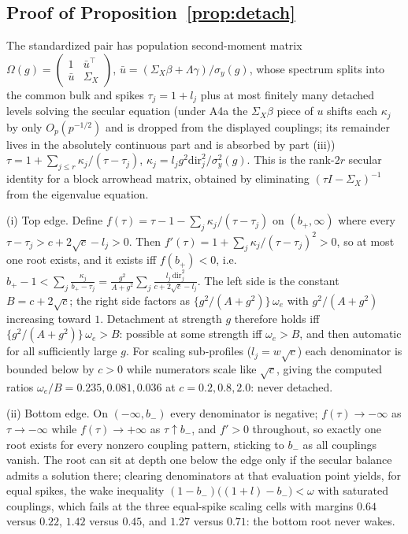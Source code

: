 \documentclass[11pt]{article}
\theoremstyle{definition}
\theoremstyle{remark}
\begin{document}
\subsection*{Proof of Proposition~\ref{prop:detach}}

The standardized pair has population second-moment matrix
$\Omega(g)=\begin{pmatrix}1&\bar u^\top\\ \bar u&\Sigma_X\end{pmatrix}$, $\bar u=(\Sigma_X\beta+\Lambda\gamma)/\sigma_y(g)$,
whose spectrum splits into the common bulk and spikes $\tau_j=1+l_j$ plus at most finitely many detached levels solving the secular equation (under A4a the $\Sigma_X\beta$ piece of $u$ shifts each $\kappa_j$ by only $O_p(p^{-1/2})$ and is dropped from the displayed couplings; its remainder lives in the absolutely continuous part and is absorbed by part (iii))
$\tau=1+\sum_{j\le r}\kappa_j/(\tau-\tau_j)$, $\kappa_j=l_jg^2\mathrm{dir}_j^2/\sigma_y^2(g)$.
This is the rank-$2r$ secular identity for a block arrowhead matrix, obtained by eliminating $(\tau I-\Sigma_X)^{-1}$ from the eigenvalue equation.

\noindent(i) Top edge. Define $f(\tau)=\tau-1-\sum_j\kappa_j/(\tau-\tau_j)$ on $(b_+,\infty)$ where every $\tau-\tau_j>c+2\sqrt c-l_j>0$. Then $f'(\tau)=1+\sum_j\kappa_j/(\tau-\tau_j)^2>0$, so at most one root exists, and it exists iff $f(b_+)<0$, i.e.
$b_+-1<\sum_j\frac{\kappa_j}{b_+-\tau_j}
=\frac{g^2}{A+g^2}\sum_j\frac{l_j\,\mathrm{dir}_j^2}{c+2\sqrt c-l_j}$.
The left side is the constant $B=c+2\sqrt c$; the right side factors as $\{g^2/(A+g^2)\}\,\omega_e$ with $g^2/(A+g^2)$ increasing toward $1$. Detachment at strength $g$ therefore holds iff $\{g^2/(A+g^2)\}\,\omega_e>B$: possible at some strength iff $\omega_e>B$, and then automatic for all sufficiently large $g$. For scaling sub-profiles ($l_j=w\sqrt c$) each denominator is bounded below by $c>0$ while numerators scale like $\sqrt c$, giving the computed ratios $\omega_e/B=0.235,0.081,0.036$ at $c=0.2,0.8,2.0$: never detached.

\noindent(ii) Bottom edge. On $(-\infty,b_-)$ every denominator is negative; $f(\tau)\to-\infty$ as $\tau\to-\infty$ while $f(\tau)\to+\infty$ as $\tau\uparrow b_-$, and $f'>0$ throughout, so exactly one root exists for every nonzero coupling pattern, sticking to $b_-$ as all couplings vanish. The root can sit at depth one below the edge only if the secular balance admits a solution there; clearing denominators at that evaluation point yields, for equal spikes, the wake inequality $(1-b_-)\bigl((1+l)-b_-\bigr)<\omega$ with saturated couplings, which fails at the three equal-spike scaling cells with margins $0.64$ versus $0.22$, $1.42$ versus $0.45$, and $1.27$ versus $0.71$: the bottom root never wakes.
\end{document}
